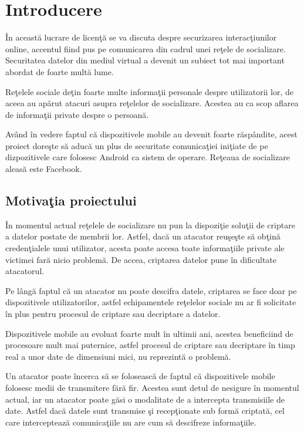 \chapter{Introducere}
\label{chapter:intro}

\^{I}n aceast\u{a} lucrare de licen\c{t}\u{a} se va discuta despre securizarea interac\c{t}iunilor online, accentul fiind pus pe comunicarea din cadrul unei re\c{t}ele de socializare. Securitatea datelor din mediul virtual a devenit un subiect tot mai important abordat de foarte mult\u{a} lume.

Re\c{t}elele sociale de\c{t}in foarte multe informa\c{t}ii personale despre utilizatorii lor, de aceea au ap\u{a}rut atacuri asupra re\c{t}elelor de socializare. Acestea au ca scop aflarea de informa\c{t}ii private despre o persoan\u{a}.   

Av\^{a}nd \^{i}n vedere faptul c\u{a} dispozitivele mobile au devenit foarte r\u{a}sp\^{a}ndite, acest proiect dore\c{s}te s\u{a} aduc\u{a} un plus de securitate comunica\c{t}iei ini\c{t}iate de pe dizpozitivele care folosesc Android ca sistem de operare. Re\c{t}eaua de socializare aleas\u{a} este Facebook.  

\section{Motiva\c{t}ia proiectului}
\label{sub-sec:proj-scope}

\^{I}n momentul actual re\c{t}elele de socializare nu pun la dispozi\c{t}ie solu\c{t}ii de criptare a datelor postate de membrii lor. Astfel, dac\u{a} un atacator reu\c{s}e\c{s}te s\u{a} ob\c{t}in\u{a} creden\c{t}ialele unui utilizator, acesta poate accesa toate informa\c{t}iile private ale victimei far\u{a} nicio problem\u{a}. De accea, criptarea datelor pune \^{i}n dificultate atacatorul.

Pe l\^{a}ng\u{a} faptul c\u{a} un atacator nu poate descifra datele, criptarea se face doar pe dispozitivele utilizatorilor, astfel echipamentele re\c{t}elelor sociale nu ar fi solicitate \^{i}n plus pentru procesul de criptare sau decriptare a datelor.

Dispozitivele mobile au evoluat foarte mult \^{i}n ultimii ani, acestea beneficiind de procesoare mult mai puternice, astfel procesul de criptare sau decriptare \^{i}n timp real a unor date de dimensiuni mici, nu reprezint\u{a} o problem\u{a}.

Un atacator poate \^{i}ncerca s\u{a} se foloseasc\u{a} de faptul c\u{a} dispozitivele mobile folosesc medii de transmitere f\u{a}r\u{a} fir. Acestea sunt detul de nesigure \^{i}n momentul actual, iar un atacator poate g\u{a}si o modalitate de a intercepta transmisiile de date. Astfel dac\u{a} datele sunt transmise \c{s}i recep\c{t}ionate sub form\u{a} criptat\u{a}, cel care intercepteaz\u{a} comunica\c{t}iile nu are cum s\u{a} descifreze informa\c{t}iile.

